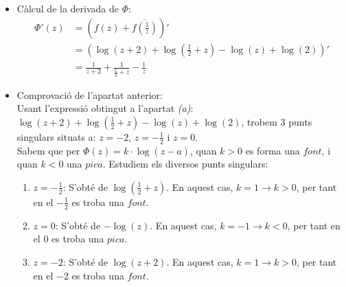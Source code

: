 \documentclass[a4paper, 11pt]{article}
\begin{document}
\begin{enumerate}[label=(\alph*)]
        \begin{itemize}
            \par
            \item Càlcul de la derivada de $\Phi$:
            \begin{equation*}
            \begin{split}
                 \Phi'(z) & = \left(f(z) + \overline{f\left(\frac{1}{\overline{z}}\right)}\right)'\\
                 & = \left(\log(z+2) + \log\left(\frac{1}{2}+z\right) - \log(z) + \log(2)\right)'\\
                 & = \frac{1}{z+2} + \frac{1}{\frac{1}{2}+z} - \frac{1}{z}
            \end{split}
        \end{equation*}
            \item Comprovació de l'apartat anterior:\\
            Usant l'expressió obtingut a l'apartat \textit{(a)}: $\log(z+2) + \log\left(\frac{1}{2}+z\right) - \log(z) + \log(2)$, trobem $3$ punts singulars situats a: $z=-2$, $z=-\frac{1}{2}$ i $z=0$.\\
            Sabem que per $\Phi(z) = k\cdot\log(z-a)$, quan $k > 0$ es forma una $font$, i quan $k < 0$ una $pica$.
            \newpage
            Estudiem els diversos punts singulars:
            \begin{enumerate}
                \item $z=-\frac{1}{2}$: S'obté de $\log\left(\frac{1}{2}+z\right)$. En aquest cas, $k=1 \rightarrow k>0$, per tant en el $-\frac{1}{2}$ es troba una $font$.
                \item $z=0$: S'obté de $- \log(z)$. En aquest cas, $k=-1 \rightarrow k<0$, per tant en el $0$ es troba una $pica$.
                \item $z=-2$: S'obté de $\log(z+2)$. En aquest cas, $k=1 \rightarrow k>0$, per tant en el $-2$ es troba una $font$.

            \end{enumerate}
            

\end{itemize}
\end{enumerate}
\end{document}
